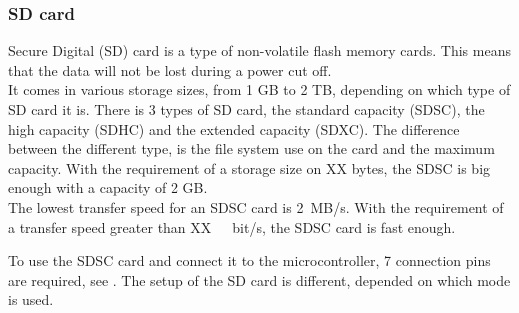 \subsubsection{SD card} \label{SDcard}
Secure Digital (SD) card is a type of non-volatile flash memory cards. This means that the data will not be lost during a power cut off.\\
%
It comes in various storage sizes, from 1 GB to 2 TB, depending on which type of SD card it is. There is 3 types of SD card, the standard capacity (SDSC), the high capacity (SDHC) and the extended capacity (SDXC). The  difference between the different type, is the file system use on the card and the maximum capacity. With the requirement of a storage size on XX bytes, the SDSC is big enough with a capacity of 2 GB.\\
%
The lowest transfer speed for an SDSC card is \si{2 MB/s}. With the requirement of a transfer speed greater than \si{XX\ bit/s}, the SDSC card is fast enough. 

To use the SDSC card and connect it to the microcontroller, 7 connection pins are required, see . The setup of the SD card is different, depended on which mode is used.

